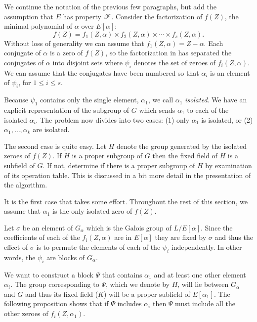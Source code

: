 We continue the notation of the previous few paragraphs, but add the
assumption that $E$ has property ${\cal F}$.
Consider the factorization of $f(Z)$, the minimal polynomial of
$\alpha$ over $E[\alpha]$:
\begin{equation}
\label{Minpoly:F:Eq}
f(Z) = f_1(Z, \alpha) \times f_2(Z, \alpha) \times \cdots 
   \times f_s(Z, \alpha).
\end{equation}
Without loss of generality we can assume that $f_1(Z, \alpha) = Z -
\alpha$.  Each conjugate of $\alpha$ is a zero of $f(Z)$, so the
factorization in  has separated the conjugates of
$\alpha$ into disjoint sets where $\psi_i$ denotes the set of zeroes
of $f_i(Z, \alpha)$.  We can assume that the conjugates have been
numbered so that $\alpha_i$ is an element of $\psi_i$, for $1 \le i
\le s$.

Because $\psi_1$ contains only the single element, $\alpha_1$, we call
$\alpha_1$ {\em isolated\/}.  We have an explicit representation of
the subgroup of $G$ which sends $\alpha_1$ to each of the isolated
$\alpha_i$.  The problem now divides into two cases: (1) only
$\alpha_1$ is isolated, or (2) $\alpha_1, \ldots, \alpha_k$ are
isolated.  

The second case is quite easy.  Let $H$ denote the group generated by
the isolated zeroes of $f(Z)$.  If $H$ is a proper subgroup of $G$ then the
fixed field of $H$ is a subfield of $G$.  If not, determine if there
is a proper subgroup of $H$ by examination of its operation table.
This is discussed in a bit more detail in the presentation of the
algorithm.

It is the first case that takes some effort.  Throughout the rest of
this section, we assume that $\alpha_1$ is the only isolated zero of
$f(Z)$.

Let $\sigma$ be an element of $G_{\alpha}$ which is the Galois group
of $L/E[\alpha]$.  Since the coefficients of each of the $f_i(Z,
\alpha)$ are in $E[\alpha]$ they are fixed by $\sigma$ and thus the
effect of $\sigma$ is to permute the elements of each of the $\psi_i$
independently.  In other words, the $\psi_i$ are blocks of
$G_{\alpha}$.  

We want to construct a block $\Psi$ that contains $\alpha_1$ and at
least one other element $\alpha_i$.  The group corresponding to
$\Psi$, which we denote by $H$, will lie between $G_{\alpha}$ and $G$
and thus its fixed field ($K$) will be a proper subfield of
$E[\alpha_1]$.  The following proposition shows that if $\Psi$
includes $\alpha_i$ then $\Psi$ must include all the other zeroes of
$f_i(Z, \alpha_1)$.

